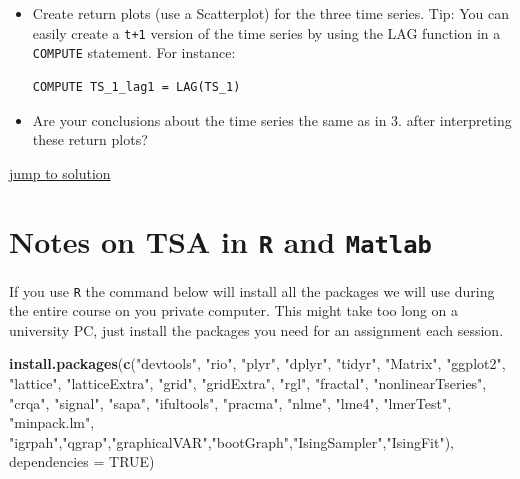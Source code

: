 \documentclass[]{book}
\newenvironment{Shaded}{\begin{snugshade}}{\end{snugshade}}
\newcommand{\KeywordTok}[1]{\textcolor[rgb]{0.13,0.29,0.53}{\textbf{{#1}}}}
\newcommand{\DataTypeTok}[1]{\textcolor[rgb]{0.13,0.29,0.53}{{#1}}}
\newcommand{\StringTok}[1]{\textcolor[rgb]{0.31,0.60,0.02}{{#1}}}
\newcommand{\OtherTok}[1]{\textcolor[rgb]{0.56,0.35,0.01}{{#1}}}
\newcommand{\NormalTok}[1]{{#1}}
\let\stdsection\section
\renewcommand\section{\newpage\stdsection}
\begin{document}
\begin{enumerate}
  \begin{itemize}
  \item
    Create return plots (use a Scatterplot) for the three time series.
    Tip: You can easily create a \texttt{t+1} version of the time series
    by using the LAG function in a \texttt{COMPUTE} statement. For
    instance:

\begin{verbatim}
COMPUTE TS_1_lag1 = LAG(TS_1)
\end{verbatim}
  \item
    Are your conclusions about the time series the same as in 3. after
    interpreting these return plots?
  \end{itemize}
\end{enumerate}

\protect\hyperlink{pacfsol}{\textbar{} jump to solution \textbar{}}

\section{\texorpdfstring{Notes on TSA in \texttt{R} and
\texttt{Matlab}}{Notes on TSA in R and Matlab}}\label{notes-on-tsa-in-r-and-matlab}

If you use \texttt{R} the command below will install all the packages we
will use during the entire course on you private computer. This might
take too long on a university PC, just install the packages you need for
an assignment each session.

\begin{Shaded}
\begin{Highlighting}[]
\KeywordTok{install.packages}\NormalTok{(}\KeywordTok{c}\NormalTok{(}\StringTok{"devtools"}\NormalTok{, }\StringTok{"rio"}\NormalTok{, }\StringTok{"plyr"}\NormalTok{, }\StringTok{"dplyr"}\NormalTok{, }\StringTok{"tidyr"}\NormalTok{, }\StringTok{"Matrix"}\NormalTok{, }
                   \StringTok{"ggplot2"}\NormalTok{, }\StringTok{"lattice"}\NormalTok{, }\StringTok{"latticeExtra"}\NormalTok{, }\StringTok{"grid"}\NormalTok{, }\StringTok{"gridExtra"}\NormalTok{, }\StringTok{"rgl"}\NormalTok{,}
                   \StringTok{"fractal"}\NormalTok{,  }\StringTok{"nonlinearTseries"}\NormalTok{,  }\StringTok{"crqa"}\NormalTok{, }
                   \StringTok{"signal"}\NormalTok{, }\StringTok{"sapa"}\NormalTok{, }\StringTok{"ifultools"}\NormalTok{, }\StringTok{"pracma"}\NormalTok{, }
                   \StringTok{"nlme"}\NormalTok{, }\StringTok{"lme4"}\NormalTok{, }\StringTok{"lmerTest"}\NormalTok{, }\StringTok{"minpack.lm"}\NormalTok{,}
                   \StringTok{"igrpah"}\NormalTok{,}\StringTok{"qgrap"}\NormalTok{,}\StringTok{"graphicalVAR"}\NormalTok{,}\StringTok{"bootGraph"}\NormalTok{,}\StringTok{"IsingSampler"}\NormalTok{,}\StringTok{"IsingFit"}\NormalTok{),}
                 \DataTypeTok{dependencies =} \OtherTok{TRUE}\NormalTok{)}
\end{Highlighting}
\end{Shaded}
\end{document}
